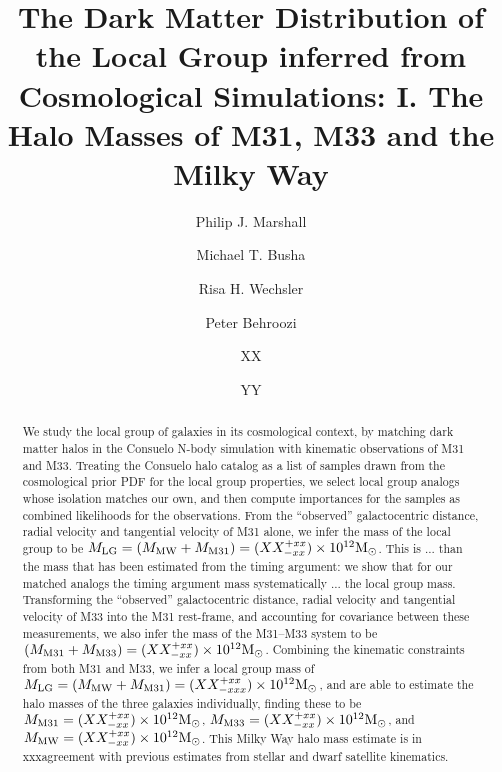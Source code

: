 \documentclass{emulateapj}
\newcommand{\MMW}{{\rm M}_{\rm MW}}
\newcommand{\Msun}{{\rm M}_\odot}
\newcommand{\consuelo}{{\sc Consuelo }}
\def\MLG{M_{\rm LG}}
\def\MMW{M_{\rm MW}}
\def\MEI{M_{\rm M31}}
\def\MEE{M_{\rm M33}}
\def\MPAIRestimate{XX}
\def\MPAIRerrorplus{xx}
\def\MPAIRerrorminus{xx}
\def\MbAestimate{XX}
\def\MbAerrorplus{xx}
\def\MbAerrorminus{xx}
\def\MTRIPLETestimate{XX}
\def\MTRIPLETerrorplus{xx}
\def\MTRIPLETerrorminus{xxx}
\def\MEIestimate{XX}
\def\MEIerrorplus{xx}
\def\MEIerrorminus{xx}
\def\MEEestimate{XX}
\def\MEEerrorplus{xx}
\def\MEEerrorminus{xx}
\def\MMWestimate{XX}
\def\MMWerrorplus{xx}
\def\MMWerrorminus{xx}
\begin{document}
\title{The Dark Matter Distribution of the Local Group inferred from
Cosmological Simulations: I. The Halo Masses of M31, M33 and the Milky Way}

\author{Philip J. Marshall}
\author{Michael T. Busha} 
\author{Risa H. Wechsler}
\author{Peter Behroozi}
\author{XX}
\author{YY}


\begin{abstract} 

We study the local group of galaxies in its cosmological context, by matching
dark matter halos in the \consuelo N-body simulation with kinematic
observations of M31 and M33. Treating the \consuelo halo  catalog as a list of
samples drawn from the cosmological prior PDF for the local group properties,
we select local group analogs whose isolation matches our own, and then
compute importances for the samples as combined likelihoods for the
observations. 
%
From the ``observed'' galactocentric distance, radial velocity and tangential 
velocity of M31 alone, we infer the mass of the local group to be $\MLG =
(\MMW + \MEI) = (\MPAIRestimate^{+\MPAIRerrorplus}_{-\MPAIRerrorminus}) \times
10^{12} \Msun$. This is ... than the mass that has been estimated from the
timing argument: we show that for our matched analogs the timing argument mass
systematically ... the local group mass. 
%
Transforming the ``observed'' galactocentric distance, radial velocity and
tangential  velocity of M33 into the M31 rest-frame, and accounting for
covariance between these measurements, we also infer the mass of the M31--M33
system to be  $(\MEI + \MEE) =
(\MbAestimate^{+\MbAerrorplus}_{-\MbAerrorminus}) \times 10^{12} \Msun$.
%
Combining the kinematic constraints from both M31 and M33,  we infer a local
group mass of $\MLG = (\MMW + \MEI) =
(\MTRIPLETestimate^{+\MTRIPLETerrorplus}_{-\MTRIPLETerrorminus}) \times
10^{12} \Msun$, and are able to estimate the halo masses of the three galaxies
individually, finding these to be $\MEI =
(\MEIestimate^{+\MEIerrorplus}_{-\MEIerrorminus}) \times 10^{12} \Msun$, $\MEE
= (\MEEestimate^{+\MEEerrorplus}_{-\MEEerrorminus}) \times 10^{12} \Msun$, 
and $\MMW = (\MMWestimate^{+\MMWerrorplus}_{-\MMWerrorminus}) \times 10^{12}
\Msun$. 
%
This Milky Way halo mass estimate is in xxxagreement with previous estimates
from stellar and dwarf satellite kinematics.

\end{abstract}
\end{document}
